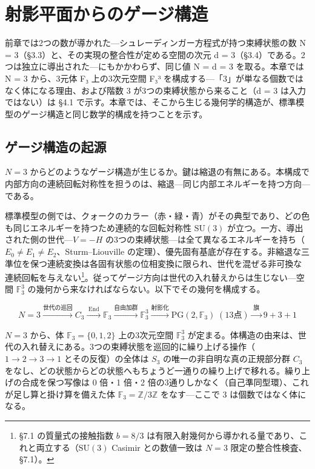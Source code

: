 \documentclass[fontsize=11pt,paper=a4,lualatex]{jlreq}
\begin{document}
\section{射影平面からのゲージ構造}\label{ux5c04ux5f71ux5e73ux9762ux304bux3089ux306eux30b2ux30fcux30b8ux69cbux9020}

前章では2つの数が導かれた---シュレーディンガー方程式が持つ束縛状態の数 N = 3（§3.3）と、その実現の整合性が定める空間の次元 d = 3（§3.4）である。2つは独立に導出された---にもかかわらず、同じ値 N = d = 3 を取る。本章では N = 3 から、3元体 F₃ 上の3次元空間 F₃³ を構成する---「3」が単なる個数ではなく体になる理由、および階数 3 が3つの束縛状態から来ること（d = 3 は入力ではない）は §4.1 で示す。本章では、そこから生じる幾何学的構造が、標準模型のゲージ構造と同じ数学的構成を持つことを示す。

\subsection{ゲージ構造の起源}\label{ux30b2ux30fcux30b8ux69cbux9020ux306eux8d77ux6e90}

$N = 3$ からどのようなゲージ構造が生じるか。鍵は縮退の有無にある。本構成で内部方向の連続回転対称性を担うのは、縮退---同じ内部エネルギーを持つ方向---である。

標準模型の側では、クォークのカラー（赤・緑・青）がその典型であり、どの色も同じエネルギーを持つため連続的な回転対称性 $\mathrm{SU}(3)$ が立つ。一方、導出された側の世代---$V = -H$ の3つの束縛状態---は全て異なるエネルギーを持ち（$E_0 \neq E_1 \neq E_2$、Sturm--Liouville の定理）、優先固有基底が存在する。非縮退な三準位を保つ連続変換は各固有状態の位相変換に限られ、世代を混ぜる非可換な連続回転を与えない\footnote{§7.1 の質量式の接触指数 $b = 8/3$ は有限入射幾何から導かれる量であり、これと両立する（$\mathrm{SU}(3)$ Casimir との数値一致は $N = 3$ 限定の整合性検査、§7.1）。}。従ってゲージ方向は世代の入れ替えからは生じない---空間 $\mathbb{F}_3^3$ の幾何から来なければならない。以下でその幾何を構成する。

\[N = 3 \xrightarrow{\text{世代の巡回}} C_3 \xrightarrow{\;\mathrm{End}\;} \mathbb{F}_3 \xrightarrow{\text{自由加群}} \mathbb{F}_3^3 \xrightarrow{\text{射影化}} \mathrm{PG}(2,\mathbb{F}_3)\;(13\text{点}) \xrightarrow{\;\text{旗}\;} 9{+}3{+}1\]

$N = 3$ から、体 $\mathbb{F}_3 = \{0, 1, 2\}$ 上の3次元空間 $\mathbb{F}_3^3$ が定まる。体構造の由来は、世代の入れ替えにある。3つの束縛状態を巡回的に繰り上げる操作（$1 \to 2 \to 3 \to 1$ とその反復）の全体は $S_3$ の唯一の非自明な真の正規部分群 $C_3$ をなし、どの状態からどの状態へもちょうど一通りの繰り上げで移れる。繰り上げの合成を保つ写像は 0 倍・1 倍・2 倍の3通りしかなく（自己準同型環）、これが足し算と掛け算を備えた体 $\mathbb{F}_3 = \mathbb{Z}/3\mathbb{Z}$ をなす---ここで 3 は個数ではなく体になる。
\end{document}
